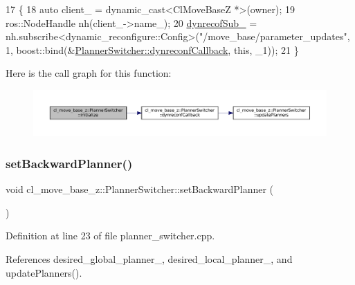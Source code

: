 \begin{DoxyCode}
17 \{
18   \textcolor{keyword}{auto} client\_ = \textcolor{keyword}{dynamic\_cast<}ClMoveBaseZ *\textcolor{keyword}{>}(owner);
19   ros::NodeHandle nh(client\_->name\_);
20   \hyperlink{classcl__move__base__z_1_1PlannerSwitcher_ae902346f4f8e58241acc56cccaad8546}{dynrecofSub\_} = nh.subscribe<dynamic\_reconfigure::Config>(\textcolor{stringliteral}{"/move\_base/parameter\_updates"}, 1, 
      boost::bind(&\hyperlink{classcl__move__base__z_1_1PlannerSwitcher_ad9371bd8d62600ef874e8914c3ec177b}{PlannerSwitcher::dynreconfCallback}, \textcolor{keyword}{this}, \_1));
21 \}
\end{DoxyCode}
Here is the call graph for this function\+:
\nopagebreak
\begin{figure}[H]
\begin{center}
\leavevmode
\includegraphics[width=350pt]{classcl__move__base__z_1_1PlannerSwitcher_a8180bda19d3fdc2bcb3d9792002cd325_cgraph}
\end{center}
\end{figure}
\mbox{\label{classcl__move__base__z_1_1PlannerSwitcher_a6995deff44418a0965e4e793de8c4857}} 
\subsubsection{\texorpdfstring{set\+Backward\+Planner()}{setBackwardPlanner()}}
{\footnotesize\ttfamily void cl\+\_\+move\+\_\+base\+\_\+z\+::\+Planner\+Switcher\+::set\+Backward\+Planner (\begin{DoxyParamCaption}{ }\end{DoxyParamCaption})}



Definition at line 23 of file planner\+\_\+switcher.\+cpp.



References desired\+\_\+global\+\_\+planner\+\_\+, desired\+\_\+local\+\_\+planner\+\_\+, and update\+Planners().



